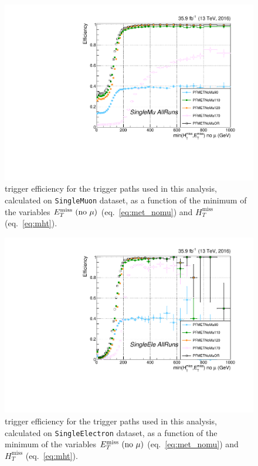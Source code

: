  \begin{figure}[!htb]
   \begin{center}
   \includegraphics[width=.7\textwidth]{ZhadZinv_thesis/TriggerTurnOn_SingleMuAllRunsmin_met_mht_nomu_Lmu3_slim.pdf}
   \end{center}
   \caption{\met trigger efficiency for the \met trigger paths used in this analysis, calculated on {\tt SingleMuon} dataset, as a function of the minimum of the variables $E_T^{\text{miss}} \text{ (no } \mu \text{)}$ (eq.~\ref{eq:met_nomu}) and ${H}_T^{\text{miss}}$ (eq.~\ref{eq:mht}).}
   \label{fig:MetTrigMu}
 \end{figure}

 \begin{figure}[!htb]
   \begin{center}
   \includegraphics[width=.7\textwidth]{ZhadZinv_thesis/TriggerTurnOn_SingleEleAllRunsmin_met_mht_nomu_Lele3_slim.pdf}
   \end{center}
   \caption{\met trigger efficiency for the \met trigger paths used in this analysis, calculated on {\tt SingleElectron} dataset, as a function of the minimum of the variables $E_T^{\text{miss}} \text{ (no } \mu \text{)}$ (eq.~\ref{eq:met_nomu}) and ${H}_T^{\text{miss}}$ (eq.~\ref{eq:mht}).}
   \label{fig:MetTrigEle}
 \end{figure}

\clearpage

